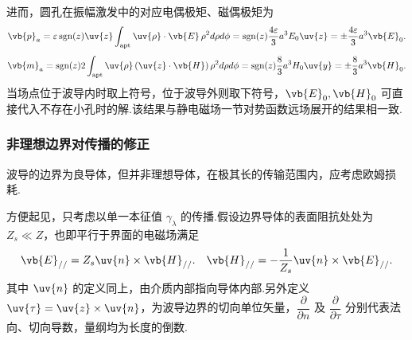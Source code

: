 进而，圆孔在振幅激发中的对应电偶极矩、磁偶极矩为
\begin{equation*}
	\vb{p}_a = \varepsilon \,\text{sgn}(z) \uv{z} \int_{\text{apt}} \uv{\rho} \cdot \vb{E} \, \rho^2 d\rho d\phi = \text{sgn}(z) \dfrac{4\varepsilon}{3} a^3 E_0 \uv{z} = \pm \dfrac{4\varepsilon}{3} a^3 \vb{E}_0.
\end{equation*}
\begin{equation*}
	\vb{m}_a = \text{sgn}(z) 2 \int_{\text{apt}} \uv{\rho} \left( \uv{z} \cdot \vb{H} \right) \rho^2 d\rho d\phi = \text{sgn}(z) \dfrac{8}{3} a^3 H_0 \uv{y} = \pm \dfrac{8}{3} a^3 \vb{H}_0.
\end{equation*}
当场点位于波导内时取上符号，位于波导外则取下符号，\(\vb{E}_0, \vb{H}_0\) 可直接代入不存在小孔时的解.该结果与静电磁场一节对势函数远场展开的结果相一致.


\subsubsection{非理想边界对传播的修正}

波导的边界为良导体，但并非理想导体，在极其长的传输范围内，应考虑欧姆损耗.

方便起见，只考虑以单一本征值 \(\gamma_{\lambda}\) 的传播.假设边界导体的表面阻抗处处为 \(Z_s \ll Z\)，也即平行于界面的电磁场满足
\begin{equation*}
	\vb{E}_{//} = Z_s \uv{n} \times \vb{H}_{//}. \quad \vb{H}_{//} = -\dfrac{1}{Z_s} \uv{n} \times \vb{E}_{//}.
\end{equation*}
其中 \(\uv{n}\) 的定义同上，由介质内部指向导体内部.另外定义 \(\uv{\tau} = \uv{z} \times \uv{n}\)，为波导边界的切向单位矢量，\(\dfrac{\partial}{\partial n}\) 及 \(\dfrac{\partial}{\partial{\tau}}\) 分别代表法向、切向导数，量纲均为长度的倒数.

